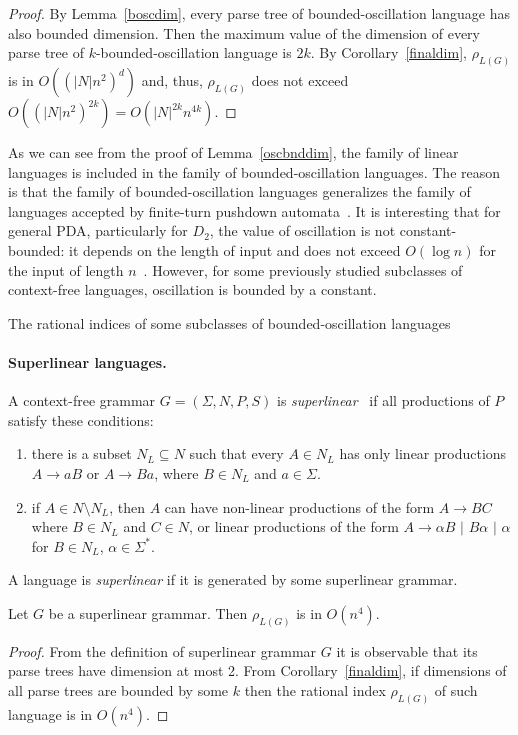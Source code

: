 \begin{proof}
By Lemma~\ref{boscdim}, every parse tree of bounded-oscillation language has also bounded dimension. Then the maximum value of the dimension of every parse tree of $k$-bounded-oscillation language is $2k$. By Corollary~\ref{finaldim}, $\rho_{L(G)}$ is in $O({(|N|n^2)}^d)$ and, thus, $\rho_{L(G)}$ does not exceed $O({(|N|n^2)}^{2k}) = O({|N|}^{2k}n^{4k})$.
\end{proof}

As we can see from the proof of Lemma~\ref{oscbnddim}, the family of linear languages is included in the family of bounded-oscillation languages. The reason is that the family of bounded-oscillation languages generalizes the family of languages accepted by finite-turn pushdown automata~\cite{BoundOsc}. It is interesting that for general PDA, particularly for $D_2$, the value of oscillation is not constant-bounded: it depends on the length of input and does not exceed $O(\log n)$ for the input of length $n$~\cite*{Gundermann, Wechsung}. However, for some previously studied subclasses of context-free languages,  oscillation is bounded by a constant.

\begin{subsection}{The rational indices of some subclasses of bounded-oscillation languages} 

\paragraph{Superlinear languages.} 
A context-free grammar $G = (\Sigma, N, P, S)$ is \textit{superlinear}~\cite{superlinear} if all productions of $P$ satisfy these conditions:
\begin{enumerate}
\item there is a subset $N_L \subseteq N$ such that every $A \in N_L$ has only linear productions $A\rightarrow aB$ or $A\rightarrow Ba$, where $B \in N_L$ and $a \in \Sigma$.
\item if $A \in N \setminus N_L$, then $A$ can have non-linear productions of the form $A \rightarrow BC$ where $B\in N_L$ and $C \in N$, or linear productions of the form $A\rightarrow \alpha B$ $\vert$ $B \alpha$ $\vert$ $\alpha$ for $B \in N_L$, $\alpha \in \Sigma^*$.
\end{enumerate}
A language is \textit{superlinear} if it is generated by some superlinear grammar. 
\begin{theorem} Let $G$ be a superlinear grammar. Then $\rho_{L(G)}$ is in $O(n^4)$.
\end{theorem}
\begin{proof}
From the definition of superlinear grammar $G$ it is observable that its parse trees have dimension at most 2. From 
Corollary~\ref{finaldim}, if dimensions of all parse trees are bounded by some $k$ then the rational index $\rho_{L(G)}$ of such language is in $O(n^4)$.
\end{proof}
\end{subsection}
